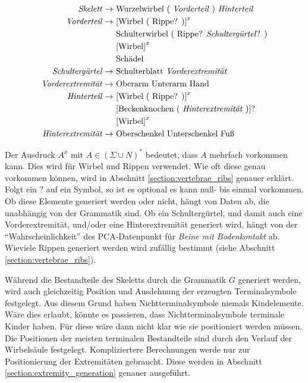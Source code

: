 \begin{align*}
 \text{\emph{Skelett}} \rightarrow &\text{ Wurzelwirbel ( \emph{Vorderteil} ) \emph{Hinterteil}}\\
 \text{\emph{Vorderteil}} \rightarrow &\text{ [Wirbel ( Rippe? )]}^x\\
    &\text{ Schulterwirbel ( Rippe? \emph{Schultergürtel}? )}\\
    &\text{ [Wirbel]}^x\\
    &\text{ Schädel}\\
 \text{\emph{Schultergürtel}} \rightarrow &\text{ Schulterblatt \emph{Vorderextremität}}\\
 \text{\emph{Vorderextremität}} \rightarrow &\text{ Oberarm Unterarm Hand}\\
 \text{\emph{Hinterteil}} \rightarrow &\text{ [Wirbel ( Rippe? )]}^x\\
    &\text{ [Beckenknochen ( \emph{Hinterextremität} )]?}\\
    &\text{ [Wirbel]}^x\\
 \text{\emph{Hinterextremität}} \rightarrow &\text{ Oberschenkel Unterschenkel Fuß}
\end{align*}

Der Ausdruck $A^x$ mit $A \in (\Sigma \cup N)^*$ bedeutet, dass $A$ mehrfach vorkommen kann. Dies wird für Wirbel und Rippen verwendet. Wie oft diese genau vorkommen können, wird in Abschnitt \ref{section:vertebrae_ribs} genauer erklärt.
Folgt ein ? auf ein Symbol, so ist es optional \dash es kann null- bis einmal vorkommen. Ob diese Elemente generiert werden oder nicht, hängt von Daten ab, die unabhängig von der Grammatik sind. Ob ein Schultergürtel, und damit auch eine Vorderextremität, und/oder eine Hinterextremität generiert wird, hängt von der "`Wahrscheinlichkeit"' des PCA-Datenpunkt für \emph{Beine mit Bodenkontakt} ab. Wieviele Rippen generiert werden wird zufällig bestimmt (siehe Abschnitt \ref{section:vertebrae_ribs}).

Während die Bestandteile des Skeletts durch die Grammatik $G$ generiert werden, wird auch gleichzeitig Position und Ausdehnung der erzeugten Terminalsymbole festgelegt.  Aus diesem Grund haben Nichtterminalsymbole niemals Kindelemente. Wäre dies erlaubt, könnte es passieren, dass Nichtterminalsymbole terminale Kinder haben. Für diese wäre dann nicht klar wie sie positioniert werden müssen.\\
Die Positionen der meisten terminalen Bestandteile sind durch den Verlauf der Wirbelsäule festgelegt. Kompliziertere Berechnungen werde nur zur Positionierung der Extremitäten gebraucht. Diese werden in Abschnitt \ref{section:extremity_generation} genauer ausgeführt.


